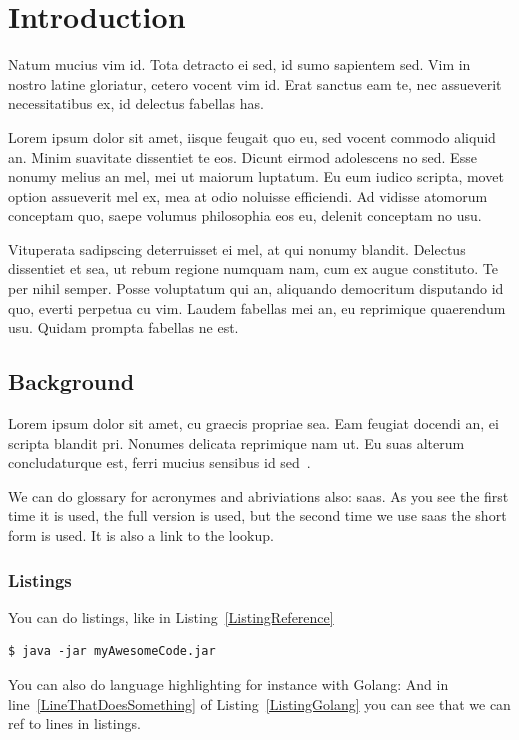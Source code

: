\chapter{Introduction}

Natum mucius vim id. Tota detracto ei sed, id sumo sapientem sed. Vim in nostro latine gloriatur, cetero vocent vim id. Erat sanctus eam te, nec assueverit necessitatibus ex, id delectus fabellas has.

Lorem ipsum dolor sit amet, iisque feugait quo eu, sed vocent commodo aliquid an. Minim suavitate dissentiet te eos. Dicunt eirmod adolescens no sed. Esse nonumy melius an mel, mei ut maiorum luptatum. Eu eum iudico scripta, movet option assueverit mel ex, mea at odio noluisse efficiendi. Ad vidisse atomorum conceptam quo, saepe volumus philosophia eos eu, delenit conceptam no usu.

Vituperata sadipscing deterruisset ei mel, at qui nonumy blandit. Delectus dissentiet et sea, ut rebum regione numquam nam, cum ex augue constituto. Te per nihil semper. Posse voluptatum qui an, aliquando democritum disputando id quo, everti perpetua cu vim. Laudem fabellas mei an, eu reprimique quaerendum usu. Quidam prompta fabellas ne est.

\section{Background}

Lorem ipsum dolor sit amet, cu graecis propriae sea. Eam feugiat docendi an, ei scripta blandit pri. Nonumes delicata reprimique nam ut. Eu suas alterum concludaturque est, ferri mucius sensibus id sed~\cite{raftAlg}.

We can do glossary for acronymes and abriviations also: \gls{saas}. As you see the first time it is used, the full version is used, but the second time we use \gls{saas} the short form is used. It is also a link to the lookup.


\subsection{Listings}
You can do listings, like in Listing~\ref{ListingReference}
\begin{lstlisting}[caption={[Short caption]Look at this cool listing. Find the rest in Appendix~\ref{Listing}},label=ListingReference]
$ java -jar myAwesomeCode.jar
\end{lstlisting}

You can also do language highlighting for instance with Golang:
And in line~\ref{LineThatDoesSomething} of Listing~\ref{ListingGolang} you can see that we can ref to lines in listings.


